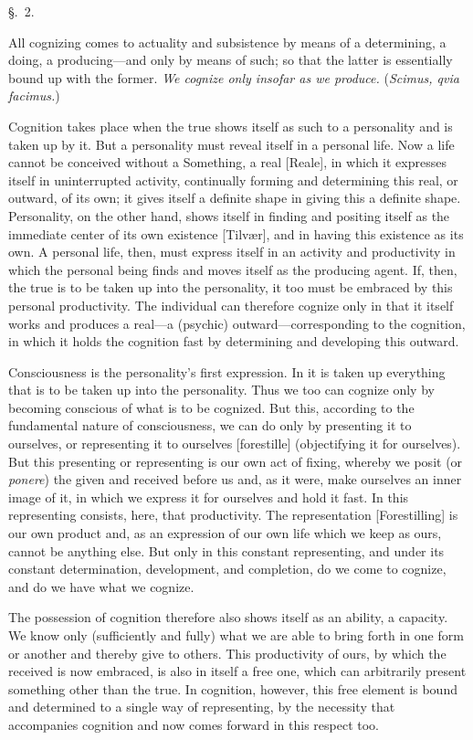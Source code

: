 \documentclass[12pt,a4paper]{book}
\begin{document}
\begin{center}\large\S.~2.\end{center}
All cognizing comes to actuality and subsistence by means of a determining, a
doing, a producing---and only by means of such; so that the latter is
essentially bound up with the former. \emph{We cognize only insofar as we
produce.} (\textit{Scimus, qvia facimus.})

Cognition takes place when the true shows itself as such to a personality and is
taken up by it. But a personality must reveal itself in a personal life. Now a
life cannot be conceived without a Something, a real [Reale], in which it
expresses itself in uninterrupted activity, continually forming and determining
this real, or outward, of its own; it gives itself a definite shape in giving
this a definite shape. Personality, on the other hand, shows itself in finding
and positing itself as the immediate center of its own existence [Tilvær], and
in having this existence as its own. A personal life, then, must express itself
in an activity and productivity in which the personal being finds and moves
itself as the producing agent. If, then, the true is to be taken up into the
personality, it too must be embraced by this personal productivity. The
individual can therefore cognize only in that it itself works and produces a
real---a (psychic) outward---corresponding to the cognition, in which it holds
the cognition fast by determining and developing this outward.

Consciousness is the personality's first expression. In it is taken up
everything that is to be taken up into the personality. Thus we too can cognize
only by becoming conscious of what is to be cognized. But this, according to the
fundamental nature of consciousness, we can do only by presenting it to
ourselves, or representing it to ourselves [forestille] (objectifying it for
ourselves). But this presenting or representing is our own act of fixing,
whereby we posit (or \textit{ponere}) the given and received before us and, as
it were, make ourselves an inner image of it, in which we express it for
ourselves and hold it fast. In this representing consists, here, that
productivity. The representation [Forestilling] is our own product and, as an
expression of our own life which we keep as ours, cannot be anything else. But
only in this constant representing, and under its constant determination,
development, and completion, do we come to cognize, and do we have what we
cognize.

The possession of cognition therefore also shows itself as an ability, a
capacity. We know only (sufficiently and fully) what we are able to bring
forth in one form or another and thereby give to others. This productivity of
ours, by which the received is now embraced, is also in itself a free one, which
can arbitrarily present something other than the true. In cognition, however,
this free element is bound and determined to a single way of representing, by the
necessity that accompanies cognition and now comes forward in this respect too.
\end{document}
